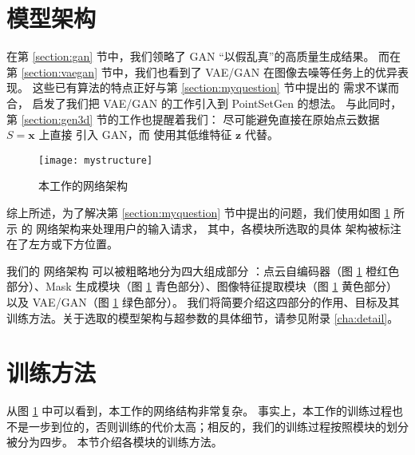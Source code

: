 \section{模型架构}
在第 \ref{section:gan} 节中，我们领略了 GAN\cite{gan} “以假乱真”的高质量生成结果。
而在第 \ref{section:vaegan} 节中，我们也看到了 VAE/GAN\cite{vaegan} 在图像去噪等任务上的优异表现。
这些已有算法的特点正好与第 \ref{section:myquestion} 节中提出的%
需求不谋而合，
启发了我们把 VAE/GAN 的工作引入到 PointSetGen 的想法。
与此同时，第 \ref{section:gen3d} 节的工作也提醒着我们：
尽可能避免直接在原始点云数据 $S = \bm x$ 上直接%
引入 GAN，而
使用其低维特征 $\bm z$ 代替。

\begin{figure}[h]
	\centering%
	{\texttt{[image: mystructure]}}
	\caption{本工作的网络架构}
	\label{fig:mystructure}
\end{figure}

综上所述，为了解决第 \ref{section:myquestion} 节中提出的问题，我们使用如图 \ref{fig:mystructure} 所示
的%
网络架构来处理用户的输入请求，%
其中，各模块所选取的具体%
架构被标注在了左方或下方位置。

我们的%
网络架构
可以被粗略地分为四大组成部分
：点云自编码器（图 \ref{fig:mystructure} 橙红色部分）、Mask 生成模块（图 \ref{fig:mystructure} 青色部分）、图像特征提取模块（图 \ref{fig:mystructure} 黄色部分）以及 VAE/GAN（图 \ref{fig:mystructure} 绿色部分）。
我们将简要介绍这四部分的作用、目标及其%
训练方法。关于选取的模型架构与超参数的具体细节，请参见附录 \ref{cha:detail}。

\section{训练方法}
从图 \ref{fig:mystructure} 中可以看到，本工作的网络结构非常复杂。
事实上，本工作的训练过程也不是一步到位的，否则训练的代价太高；相反的，我们的训练过程按照模块的划分被分为四步。
本节介绍各模块的训练方法。
